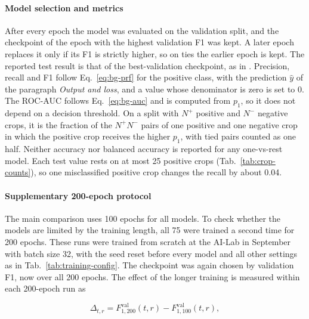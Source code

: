 \paragraph{Model selection and metrics}
\label{sec:methodology-metrics}
After every epoch the model was evaluated on the validation split, and the checkpoint
of the epoch with the highest validation F1 was kept. A later epoch replaces it only
if its F1 is strictly higher, so on ties the earlier epoch is kept. The reported test
result is that of the best-validation checkpoint, as in \citet{pawlowski2019needles}. Precision, recall and F1 follow Eq.~\eqref{eq:bg-prf} for
the positive class, with the prediction $\hat{y}$ of the paragraph \emph{Output and
loss}, and a value whose denominator is zero is set to 0. The ROC-AUC follows
Eq.~\eqref{eq:bg-auc} and is computed from $p_1$, so it does not depend on a decision
threshold. On a split with $N^+$ positive and $N^-$ negative crops, it is the fraction
of the $N^+ N^-$ pairs of one positive and one negative crop in which the positive crop
receives the higher $p_1$, with tied pairs counted as one half. Neither accuracy nor
balanced accuracy is reported for any one-vs-rest model. Each test value rests on at
most 25 positive crops (Tab.~\ref{tab:crop-counts}), so one misclassified positive crop
changes the recall by about 0.04.

\paragraph{Supplementary 200-epoch protocol}
\label{sec:methodology-200epoch}
The main comparison uses 100 epochs for all models. To check whether the models are
limited by the training length, all 75 were trained a second time for 200 epochs.
These runs were trained from scratch at the AI-Lab in September with batch size 32, with the seed
reset before every model and all other settings as in
Tab.~\ref{tab:training-config}. The checkpoint was again chosen by validation F1, now
over all 200 epochs. The effect of the longer training is measured within each
200-epoch run as

\begin{equation}
\Delta_{t,r} = F_{1,200}^{\mathrm{val}}(t, r) - F_{1,100}^{\mathrm{val}}(t, r),
\label{eq:delta-f1}
\end{equation}

